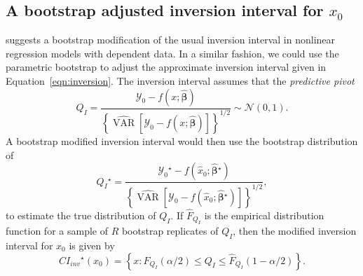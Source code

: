 \documentclass{article}\usepackage[]{graphicx}\usepackage[]{color}
\newcommand{\boot}{\ensuremath{^\star}}
\newcommand{\VAR}{\operatorname{VAR}}
\newcommand{\SE}{\operatorname{SE}}
\begin{document}


\subsection{A bootstrap adjusted inversion interval for $x_0$}

\citet{huet-statistical-2004} suggests a bootstrap modification of the usual inversion interval in nonlinear regression models with dependent data.  In a similar fashion, we could use the parametric bootstrap to adjust the approximate inversion interval given in Equation~\eqref{eqn:inversion}.  The inversion interval assumes that the \emph{predictive pivot}
\[
  Q_I = \frac{\mathcal{Y}_0-f\left(x; \widehat{\bm{\beta}}\right)}{\left\{ \widehat{\VAR}\left[\mathcal{Y}_0 - f\left(x; \widehat{\bm{\beta}}\right)\right] \right\}^{1/2}} \sim \mathcal{N}(0, 1).
\]
A bootstrap modified inversion interval would then use the bootstrap distribution of
\[
  Q_I\boot = \frac{\mathcal{Y}_0\boot-f\left(\widehat{x}_0; \widehat{\bm{\beta}}\boot\right)}{\left\{ \widehat{\VAR}\left[\mathcal{Y}_0 - f\left(\widehat{x}_0; \widehat{\bm{\beta}}\boot\right)\right] \right\}^{1/2}},
\]
to estimate the true distribution of $Q_I$.  If $\widehat{F}_{Q_I}$ is the empirical distribution function for a sample of $R$ bootstrap replicates of $Q_I$, then the modified inversion interval for $x_0$ is given by
\[
    CI_{inv}\boot\left(x_0\right) = \left\{ x: \widehat{F}_{Q_I}\left(\alpha/2\right) \le Q_I \le \widehat{F}_{Q_I}\left(1-\alpha/2\right) \right\}.
\]
\vspace{25pt}
\end{document}
